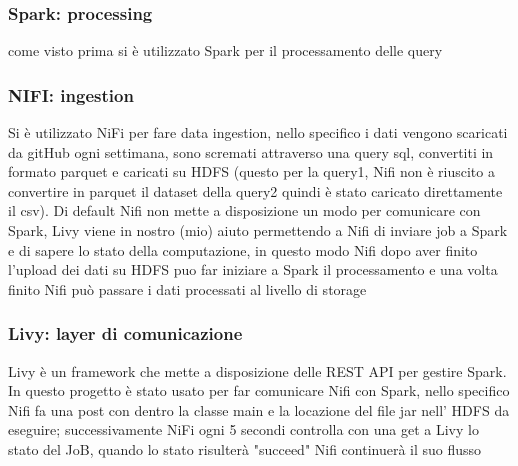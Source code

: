 \documentclass[acmsmall]{acmart}
\begin{document}
\subsubsection{Spark: processing} 
come visto prima si è utilizzato Spark per il processamento delle query 
\subsubsection{NIFI: ingestion}
Si è utilizzato NiFi per fare data ingestion, nello specifico i dati vengono scaricati da gitHub ogni settimana, sono scremati attraverso una query sql, convertiti in formato parquet e caricati su HDFS (questo per la query1, Nifi non è riuscito a convertire in parquet il dataset della query2 quindi è stato caricato direttamente il csv).
Di default Nifi non mette a disposizione un modo per comunicare con Spark, Livy viene in nostro (mio) aiuto permettendo a Nifi di inviare job a Spark e di sapere lo stato della computazione, in questo modo Nifi dopo aver finito l'upload dei dati su HDFS puo far iniziare a Spark il processamento e una volta finito Nifi può passare i dati processati al livello di storage
\subsubsection{Livy: layer di comunicazione}
Livy è un framework che mette a disposizione delle REST API per gestire Spark. In questo progetto è stato usato per far comunicare Nifi con Spark, nello specifico Nifi fa una post con dentro la classe main e la locazione del file jar nell' HDFS  da eseguire;
successivamente NiFi ogni 5 secondi controlla con una get a Livy lo stato del JoB, quando lo stato risulterà "succeed" Nifi continuerà il suo flusso 
\end{document}
